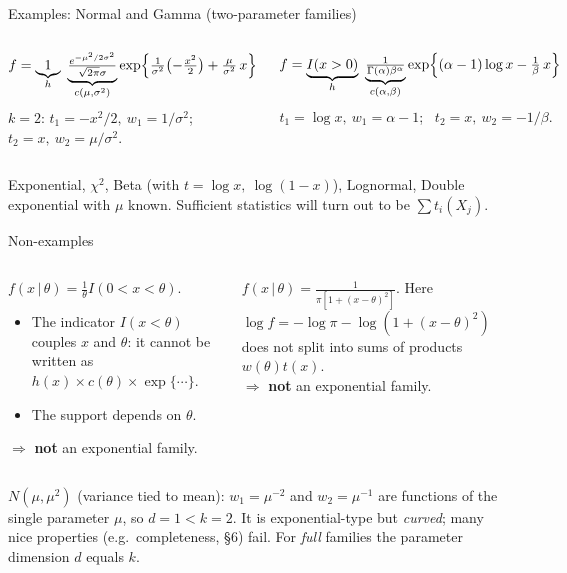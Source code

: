 \documentclass[aspectratio=169,t,10pt]{beamer}
\newcommand{\given}{\,|\,}
\begin{document}
\begin{frame}{Examples: Normal and Gamma (two-parameter families)}
  \begin{columns}[T]
  \begin{tcolorbox}[myex={Normal$(\mu,\sigma^2)$}]\small
  \[f=\underbrace{1}_{h}\ \underbrace{\tfrac{e^{-\mu^2/2\sigma^2}}{\sqrt{2\pi}\sigma}}_{c(\mu,\sigma^2)}\exp\Bigl\{\tfrac1{\sigma^2}\bigl(-\tfrac{x^2}{2}\bigr)+\tfrac\mu{\sigma^2}\,x\Bigr\}\]
  $k=2$: $t_1=-x^2/2,\ w_1=1/\sigma^2$; \ $t_2=x,\ w_2=\mu/\sigma^2$.
  \end{tcolorbox}
  \begin{tcolorbox}[myex={Gamma$(\alpha,\beta)$}]\small
  \[f=\underbrace{I(x>0)}_{h}\ \underbrace{\tfrac1{\Gamma(\alpha)\beta^\alpha}}_{c(\alpha,\beta)}\exp\Bigl\{(\alpha-1)\log x-\tfrac1\beta\,x\Bigr\}\]
  $t_1=\log x,\ w_1=\alpha-1$; \ $t_2=x,\ w_2=-1/\beta$.
  \end{tcolorbox}
  \end{columns}
  \begin{tcolorbox}[mynote={Also exponential families}]\small
  Exponential, $\chi^2$, Beta (with $t=\log x,\ \log(1-x)$), Lognormal, Double exponential with $\mu$ known. Sufficient statistics will turn out to be $\sum t_i(X_j)$.
  \end{tcolorbox}
\end{frame}

\begin{frame}{Non-examples}
  \begin{columns}[T]
  \begin{tcolorbox}[myquiz={Uniform$(0,\theta)$}]\small
  $f(x\given\theta)=\frac1\theta I(0<x<\theta)$.
  \begin{itemize}
    \item The indicator $I(x<\theta)$ couples $x$ and $\theta$: it cannot be written as $h(x)\times c(\theta)\times\exp\{\cdots\}$.
    \item The support depends on $\theta$.
  \end{itemize}
  $\Rightarrow$ \textbf{not} an exponential family.
  \end{tcolorbox}
  \begin{tcolorbox}[myquiz={Cauchy$(\theta)$}]\small
  $f(x\given\theta)=\frac1{\pi[1+(x-\theta)^2]}$. Here $\log f=-\log\pi-\log(1+(x-\theta)^2)$ does not split into sums of products $w(\theta)t(x)$.
  \\ $\Rightarrow$ \textbf{not} an exponential family.
  \end{tcolorbox}
  \end{columns}
  \begin{tcolorbox}[mynote={A subtle case: curved exponential families}]\small
  $N(\mu,\mu^2)$ (variance tied to mean): $w_1=\mu^{-2}$ and $w_2=\mu^{-1}$ are functions of the single parameter $\mu$, so $d=1<k=2$. It is exponential-type but \emph{curved}; many nice properties (e.g.\ completeness, \S6) fail. For \emph{full} families the parameter dimension $d$ equals $k$.
  \end{tcolorbox}
\end{frame}
\end{document}
